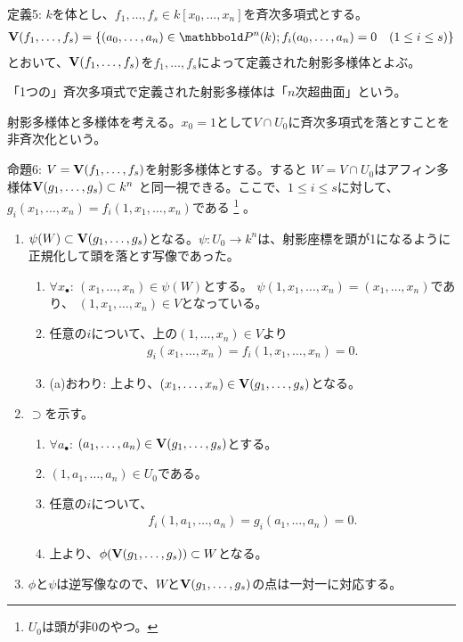 \begin{framed}
  定義5:
  $k$を体とし、$f_1,\dots,f_s \in k[x_0,\dots,x_n]$を斉次多項式とする。
  \begin{align}
    \var(f_1,\dots,f_s)
    =
    \set{(a_0,\dots,a_n) \in \P^n(k); f_i(a_0,\dots,a_n) = 0 \quad (1\le i \le s)}
  \end{align}
  とおいて、$\textbf V(f_1,\dots,f_s)$を$f_1,\dots,f_s$によって定義された射影多様体とよぶ。
\end{framed}

「1つの」斉次多項式で定義された射影多様体は「$n$次超曲面」という。

射影多様体と多様体を考える。$x_0=1$として$V\cap U_0$に斉次多項式を落とすことを
非斉次化という。
\begin{framed}
  命題6:
  $V=\textbf V(f_1,\dots,f_s)$を射影多様体とする。すると
  $W=V\cap U_0$はアフィン多様体$\textbf V(g_1,\dots,g_s) \subset k^n$
  と同一視できる。ここで、$1\le i \le s$に対して、
  $g_i(x_1,\dots,x_n) = f_i(1,x_1,\dots,x_n)$である
  \footnote{$U_0$は頭が非0のやつ。}
  。
\end{framed}
\begin{myproof}
  \begin{enumerate}
    \item $\psi(W) \subset \textbf V(g_1,\dots,g_s)$となる。$\psi\colon U_0 \to k^n$は、射影座標を頭が1になるように正規化して頭を落とす写像であった。
    \begin{enumerate}
      \item $\forall x_\bullet$:
      $(x_1,\dots,x_n)\in \psi(W)$とする。
      $\psi(1,x_1,\dots,x_n) = (x_1,\dots,x_n)$であり、
      $(1,x_1,\dots,x_n) \in V$となっている。
      \item 任意の$i$について、上の$(1,\dots,x_n)\in V$より
      \begin{align}
        g_i(x_1,\dots,x_n)
        =
        f_i(1,x_1,\dots,x_n)
        =0.
      \end{align}
      \item (a)おわり:
      上より、$(x_1,\dots,x_n) \in \textbf V(g_1,\dots,g_s)$となる。
    \end{enumerate}
    \item
    $\supset$を示す。
    \begin{enumerate}
      \item $\forall a_\bullet$: $(a_1,\dots,a_n) \in \textbf V(g_1,\dots,g_s)$とする。
      \item $(1,a_1,\dots,a_n) \in U_0$である。
      \item 任意の$i$について、
      \begin{align}
        f_i(1,a_1,\dots,a_n) = g_i(a_1,\dots,a_n) = 0.
      \end{align}
      \item
      上より、$\phi(\textbf V(g_1,\dots,g_s)) \subset W$となる。
    \end{enumerate}
    \item
    $\phi$と$\psi$は逆写像なので、$W$と$\textbf V(g_1,\dots,g_s)$の点は一対一に対応する。
  \end{enumerate}
\end{myproof}

